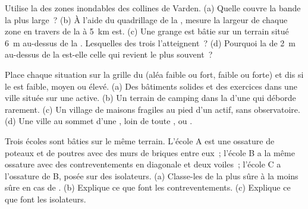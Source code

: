 \begin{exercise}[$\star\star$]\label{exo:g9:natural-risks:6}
Utilise la  des zones inondables des collines de Varden. (a) Quelle
 couvre la bande la plus large~? (b) À l'aide du quadrillage de la
, mesure la largeur de chaque zone en travers de la  à
\qty{5}{km} est. (c) Une grange est bâtie sur un terrain situé
\qty{6}{m} au-dessus de la .
Lesquelles des trois  l'atteignent~? (d) Pourquoi la  de
\qty{2}{m} au-dessus de la  est-elle celle qui revient le plus
souvent~?
\end{exercise}

\begin{exercise}[$\star\star$]\label{exo:g9:natural-risks:7}
Place chaque situation sur la grille du  (aléa faible ou fort,
 faible ou forte) et dis si le  est faible, moyen ou
élevé. (a) Des bâtiments solides et des exercices dans une ville située
sur une  active. (b) Un terrain de camping dans la  d'une  qui déborde rarement. (c) Un village de maisons
fragiles au pied d'un  actif, sans observatoire. (d) Une ville au
sommet d'une , loin de toute ,  ou .
\end{exercise}

\begin{exercise}[$\star\star$]\label{exo:g9:natural-risks:8}
Trois écoles sont bâties sur le même terrain. L'école A est une ossature
de poteaux et de poutres avec des murs de briques entre eux~; l'école B a
la même ossature avec des contreventements en diagonale et deux voiles~;
l'école C a l'ossature de B, posée sur des isolateurs. (a) Classe-les de
la plus sûre à la moins sûre en cas de . (b) Explique ce que font
les contreventements. (c) Explique ce que font les isolateurs.
\end{exercise}

